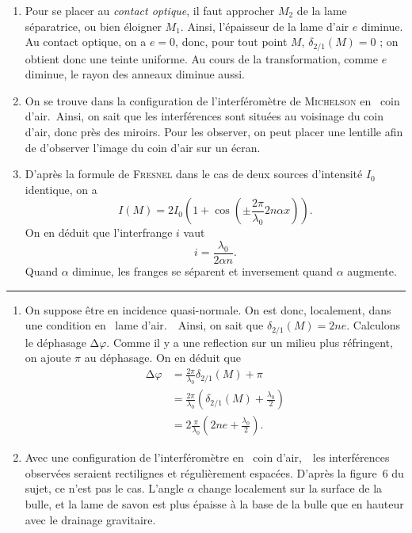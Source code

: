 \documentclass[a4paper, 11pt]{article}
\let\gguillemotleft\guillemotleft
\let\gguillemotright\guillemotright
\def\guillemotleft{\textsf{\gguillemotleft}}
\def\guillemotright{\textsf{\gguillemotright}}
\begin{document}
\begin{multicols}{2}
\begin{enumerate}[label=(\arabic*)]
			\item Pour se placer au \textit{contact optique}, il faut approcher $M_2$\/ de la lame séparatrice, ou bien éloigner $M_1$. Ainsi, l'épaisseur de la lame d'air $e$\/ diminue. Au contact optique, on a $e = 0$, donc, pour tout point $M$, $\delta_{2 / 1}(M) = 0$ ; on obtient donc une teinte uniforme.
				Au cours de la transformation, comme $e$\/ diminue, le rayon des anneaux diminue aussi.
			\item On se trouve dans la configuration de l'interféromètre de \textsc{Michelson} en \guillemotleft~coin d'air.~\guillemotright\@ Ainsi, on sait que les interférences sont situées au voisinage du coin d'air, donc près des miroirs. Pour les observer, on peut placer une lentille afin de d'observer l'image du coin d'air sur un écran.
			\item D'après la formule de \textsc{Fresnel} dans le cas de deux sources d'intensité $I_0$\/ identique, on a \[
					I(M) = 2I_0\left( 1 + \cos\left( \pm\frac{2\pi}{\lambda_0} 2n \alpha x \right) \right)
				.\] On en déduit que l'interfrange $i$\/ vaut \[
					i = \frac{\lambda_0}{2\alpha n}
				.\]
				Quand $\alpha$\/ diminue, les franges se séparent et inversement quand $\alpha$\/ augmente.
		\end{enumerate}
		\bigskip
		\quad\hrule
		\begin{enumerate}[label=(\arabic*),start=8]
			\item On suppose être en incidence quasi-normale. On est donc, localement, dans une condition en \guillemotleft~lame d'air.~\guillemotright\ Ainsi, on sait que $\delta_{2 / 1}(M) = 2 n e$. Calculons le déphasage $\mathrm{\Delta}\varphi$\/. Comme il y a une reflection sur un milieu plus réfringent, on ajoute $\pi$\/ au déphasage. On en déduit que
				\begin{align*}
					\mathrm{\Delta}\varphi &= \frac{2\pi}{\lambda_0} \delta_{2 / 1}(M) + \pi\\
					&= \frac{2\pi}{\lambda_0} \left( \delta_{2/1}(M) + \frac{\lambda_0}{2} \right)\\
					&= 2 \frac{\pi}{\lambda_0}\left( 2ne + \frac{\lambda_0}{2} \right).
				\end{align*}
			\item Avec une configuration de l'interféromètre en \guillemotleft~coin d'air,~\guillemotright\ les interférences observées seraient rectilignes et régulièrement espacées. D'après la figure~6 du sujet, ce n'est pas le cas. L'angle $\alpha$\/ change localement sur la surface de la bulle, et la lame de savon est plus épaisse à la base de la bulle que en hauteur avec le drainage gravitaire.

\end{enumerate}
\end{multicols}
\end{document}
